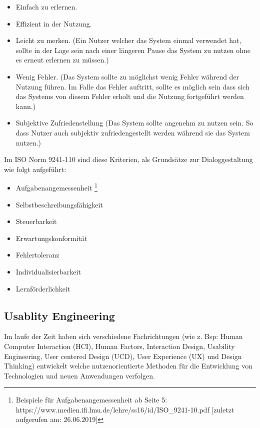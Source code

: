 \begin{itemize}
	\item Einfach zu erlernen.
	\item Effizient in der Nutzung.
	\item Leicht zu merken. (Ein Nutzer welcher das System einmal verwendet hat, sollte in der Lage sein nach einer längeren Pause das System zu nutzen ohne es erneut erlernen zu müssen.)
	\item Wenig Fehler. (Das System sollte zu möglichst wenig Fehler während der Nutzung führen. Im Falle das Fehler auftritt, sollte es möglich sein dass sich das Systems von diesem Fehler erholt und die Nutzung fortgeführt werden kann.)
	\item Subjektive Zufriedenstellung (Das System sollte angenehm zu nutzen sein. So dass Nutzer auch subjektiv zufriedengestellt werden während sie das System nutzen.)
\end{itemize}

Im ISO Norm  9241-110 sind diese Kriterien, als Grundsätze zur Dialoggestaltung wie folgt aufgeführt:

\begin{itemize}
	\item Aufgabenangemessenheit \footnote{Beispiele für Aufgabenangemessenheit ab Seite 5: https://www.medien.ifi.lmu.de/lehre/ss16/id/ISO\_9241-10.pdf [zuletzt aufgerufen am: 26.06.2019]}
	\item Selbstbeschreibungsfähigkeit
	\item Steuerbarkeit
	\item Erwartungskonformität
	\item Fehlertoleranz
	\item Individualisierbarkeit
	\item Lernförderlichkeit
\end{itemize}



\subsection{Usablity Engineering}

\cite{MichaelRichter2016} Im laufe der Zeit haben sich verschiedene Fachrichtungen (wie z. Bsp: Human Computer Interaction (HCI), Human Factors, Interaction Design, Usability Engineering, 
User centered Design (UCD), User Experience (UX) und Design Thinking)  entwickelt welche nutzenorientierte Methoden für die Entwicklung von Technologien und neuen Anwendungen verfolgen. 

